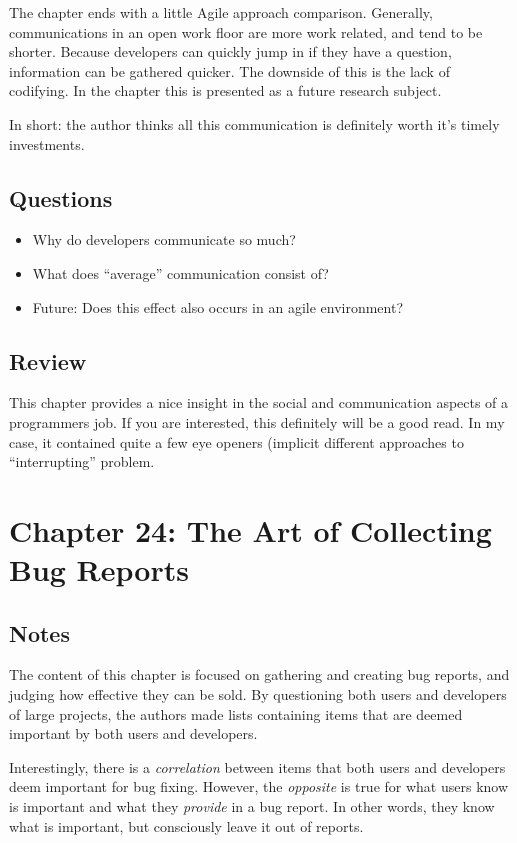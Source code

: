 The chapter ends with a little Agile approach comparison. 
Generally, communications in an open work floor are more work related, and tend to be shorter. 
Because developers can quickly jump in if they have a question, information can be gathered quicker. 
The downside of this is the lack of codifying. 
In the chapter this is presented as a future research subject. 

In short: the author thinks all this communication is definitely worth it's timely investments. 

\subsection{Questions}
\begin{itemize}
  \item Why do developers communicate so much?
  \item What does ``average'' communication consist of?
  \item Future: Does this effect also occurs in an agile environment?
\end{itemize}

\subsection{Review}
This chapter provides a nice insight in the social and communication aspects of a programmers job. 
If you are interested, this definitely will be a good read. 
In my case, it contained quite a few eye openers (implicit different approaches to ``interrupting'' problem. 

\section{Chapter 24: The Art of Collecting Bug Reports}
\subsection{Notes}
The content of this chapter is focused on gathering and creating bug reports, and judging how effective they can be sold. 
By questioning both users and developers of large projects, the authors made lists containing items that are deemed important by both users and developers. 

Interestingly, there is a \emph{correlation} between items that both users and developers deem important for bug fixing.
However, the \emph{opposite} is true for what users know is important and what they \emph{provide} in a bug report. 
In other words, they know what is important, but consciously leave it out of reports. 

